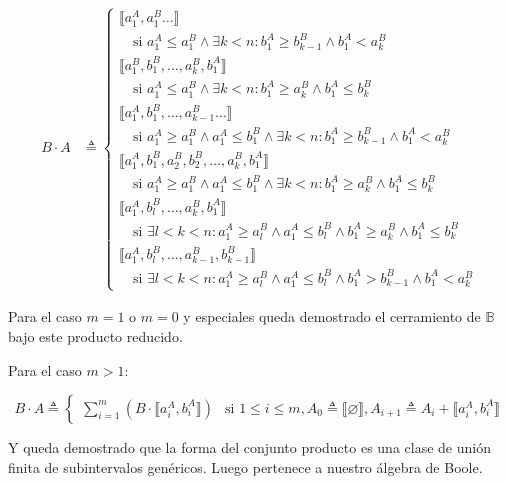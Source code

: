 \begin{enumerate}
\begin{align*}
B \cdot A &\triangleq \begin{cases}
  \llbracket a_1^A, a_1^B \dots \rrbracket \\
  \quad \text{si } a_1^A \le a_1^B \land \exists k<n : b_1^A \ge b_{k-1}^B \land b_1^A < a_k^B \\
  \llbracket a_1^B, b_1^B, \ldots, a_k^B, b_1^A \rrbracket \\
  \quad \text{si } a_1^A \le a_1^B \land \exists k<n : b_1^A \ge a_k^B \land b_1^A \le b_k^B \\
  \llbracket a_1^A, b_1^B, \ldots, a_{k-1}^B \dots \rrbracket \\
  \quad \text{si } a_1^A \ge a_1^B \land a_1^A \le b_1^B \land \exists k<n : b_1^A \ge b_{k-1}^B \land b_1^A < a_k^B \\
  \llbracket a_1^A, b_1^B, a_2^B, b_2^B, \ldots, a_k^B, b_1^A \rrbracket \\
  \quad \text{si } a_1^A \ge a_1^B \land a_1^A \le b_1^B \land \exists k<n : b_1^A \ge a_k^B \land b_1^A \le b_k^B \\
  \llbracket a_1^A, b_l^B, \dots, a_k^B, b_1^A \rrbracket \\
  \quad \text{si } \exists l<k<n : a_1^A \ge a_l^B \land a_1^A \le b_l^B \land b_1^A \ge a_k^B \land b_1^A \le b_k^B \\
  \llbracket a_1^A, b_l^B, \dots, a_{k-1}^B, b_{k-1}^B \rrbracket \\
  \quad \text{si } \exists l<k<n : a_1^A \ge a_l^B \land a_1^A \le b_l^B \land b_1^A > b_{k-1}^B \land b_1^A < a_k^B
\end{cases}
\end{align*}

Para el caso $m = 1$ o $m = 0$ y especiales queda demostrado el cerramiento de $\mathbb{B}$ bajo este producto reducido.

Para el caso $m > 1:$

\[
B \cdot A \triangleq \begin{cases}
  \sum_{i=1}^{m} \left( B \cdot \llbracket a_i^A, b_i^A \rrbracket \right) & \text{si } 1 \le i \le m, A_0 \triangleq \llbracket \varnothing \rrbracket, A_{i+1} \triangleq A_i + \llbracket a_i^A, b_i^A \rrbracket
\end{cases}
\]
\end{enumerate}

Y queda demostrado que la forma del conjunto producto es una clase de
  unión finita de subintervalos genéricos. Luego pertenece a nuestro
  álgebra de Boole.

